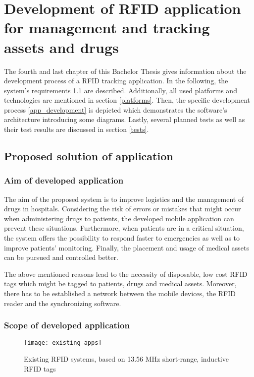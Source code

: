 \chapter{Development of RFID application for management and tracking assets and drugs}
\label{Kap3}

The fourth and last chapter of this Bachelor Thesis gives information about the development process of a RFID tracking application. In the following, the system's requirements \ref{requirements} are described. Additionally, all used platforms and technologies are mentioned in section \ref{platforms}. Then, the specific development process \ref{app_development} is depicted which demonstrates the software's architecture introducing some diagrams. Lastly, several planned tests as well as their test results are discussed in section \ref{tests}.

\section{Proposed solution of application}\label{requirements}

\subsection{Aim of developed application}

The aim of the proposed system is to improve logistics and the management of drugs in hospitals. Considering the risk of errors or mistakes that might occur when administering drugs to patients, the developed mobile application can prevent these situations. Furthermore, when patients are in a critical situation, the system offers the possibility to respond faster to emergencies as well as to improve patients' monitoring. Finally, the placement and usage of medical assets can be pursued and controlled better. 

The above mentioned reasons lead to the necessity of disposable, low cost RFID tags which might be tagged to patients, drugs and medical assets. Moreover, there has to be established a network between the mobile devices, the RFID reader and the synchronizing software. 

\subsection{Scope of developed application}

\begin{figure}
\centering
\texttt{[image: existing\_apps]} 
\caption{\label{fig:existing_apps} Existing RFID systems, based on 13.56 MHz short-range, inductive RFID tags} 
\end{figure}

